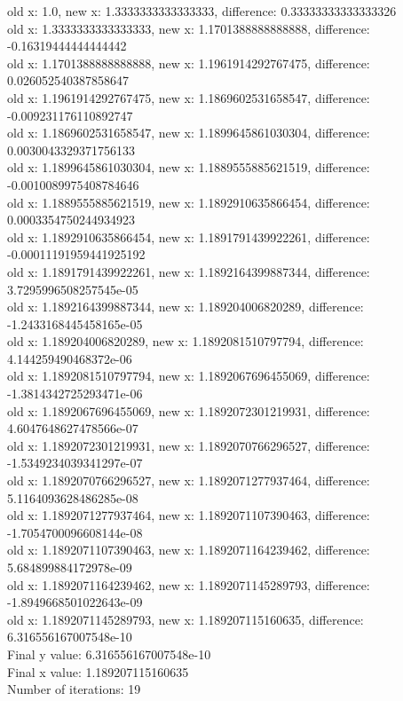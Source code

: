 \documentclass[12pt]{article}
\begin{document}
\begin{enumerate}
\begin{footnotesize}
\begin{spacing}{-.8}
old x: 1.0, new x: 1.3333333333333333, difference: 0.33333333333333326\\
old x: 1.3333333333333333, new x: 1.1701388888888888, difference: -0.16319444444444442\\
old x: 1.1701388888888888, new x: 1.1961914292767475, difference: 0.026052540387858647\\
old x: 1.1961914292767475, new x: 1.1869602531658547, difference: -0.009231176110892747\\
old x: 1.1869602531658547, new x: 1.1899645861030304, difference: 0.0030043329371756133\\
old x: 1.1899645861030304, new x: 1.1889555885621519, difference: -0.0010089975408784646\\
old x: 1.1889555885621519, new x: 1.1892910635866454, difference: 0.0003354750244934923\\
old x: 1.1892910635866454, new x: 1.1891791439922261, difference: -0.00011191959441925192\\
old x: 1.1891791439922261, new x: 1.1892164399887344, difference: 3.7295996508257545e-05\\
old x: 1.1892164399887344, new x: 1.189204006820289, difference: -1.2433168445458165e-05\\
old x: 1.189204006820289, new x: 1.1892081510797794, difference: 4.144259490468372e-06\\
old x: 1.1892081510797794, new x: 1.1892067696455069, difference: -1.3814342725293471e-06\\
old x: 1.1892067696455069, new x: 1.1892072301219931, difference: 4.6047648627478566e-07\\
old x: 1.1892072301219931, new x: 1.1892070766296527, difference: -1.5349234039341297e-07\\
old x: 1.1892070766296527, new x: 1.1892071277937464, difference: 5.1164093628486285e-08\\
old x: 1.1892071277937464, new x: 1.1892071107390463, difference: -1.7054700096608144e-08\\
old x: 1.1892071107390463, new x: 1.1892071164239462, difference: 5.684899884172978e-09\\
old x: 1.1892071164239462, new x: 1.1892071145289793, difference: -1.8949668501022643e-09\\
old x: 1.1892071145289793, new x: 1.189207115160635, difference: 6.316556167007548e-10\\
Final y value: 6.316556167007548e-10\\
Final x value: 1.189207115160635\\
Number of iterations: 19\\
\end{spacing}
\end{footnotesize}
\vspace{.4in}


\end{enumerate}
\end{document}

